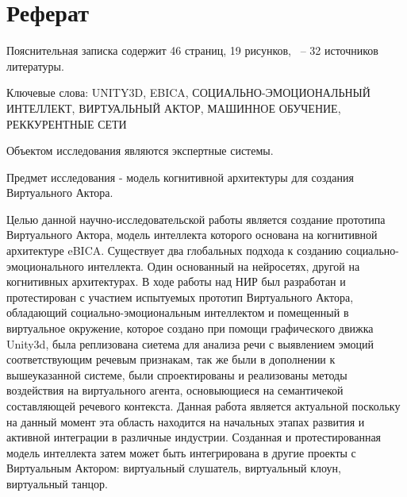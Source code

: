 \chapter*{Реферат}
\thispagestyle{plain}


Пояснительная записка содержит 46 страниц, 19 рисунков, ~-- 32 источников литературы.

Ключевые слова: UNITY3D, EBICA, СОЦИАЛЬНО-ЭМОЦИОНАЛЬНЫЙ ИНТЕЛЛЕКТ, ВИРТУАЛЬНЫЙ АКТОР, МАШИННОЕ ОБУЧЕНИЕ, РЕККУРЕНТНЫЕ СЕТИ 

Объектом исследования являются экспертные системы.

Предмет исследования - модель когнитивной архитектуры для создания Виртуального Актора.

Целью данной научно-исследовательской работы является создание прототипа Виртуального Актора, 
модель интеллекта которого основана на когнитивной архитектуре eBICA.
Существует два глобальных подхода к созданию социально-эмоционального интеллекта. 
Один основанный на нейросетях, другой на когнитивных архитектурах.
В ходе работы над НИР был разработан и протестирован с участием испытуемых прототип Виртуального Актора, 
обладающий социально-эмоциональным интеллектом и помещенный в виртуальное окружение, которое создано при помощи графического движка Unity3d, 
была реплизована сиетема для анализа речи с выявлением эмоций соответствующим речевым признакам, так же были
в дополнении к вышеуказанной системе, были спроектированы и реализованы методы 
воздействия на виртуального агента, основыющиеся на семантичекой составляющей речевого контекста.
Данная работа является актуальной поскольку на данный момент эта область находится на начальных этапах 
развития и активной интеграции в различные индустрии.
Созданная и протестированная модель интеллекта затем может быть интегрирована в другие проекты с 
Виртуальным Актором: виртуальный слушатель, виртуальный клоун, виртуальный танцор. 


